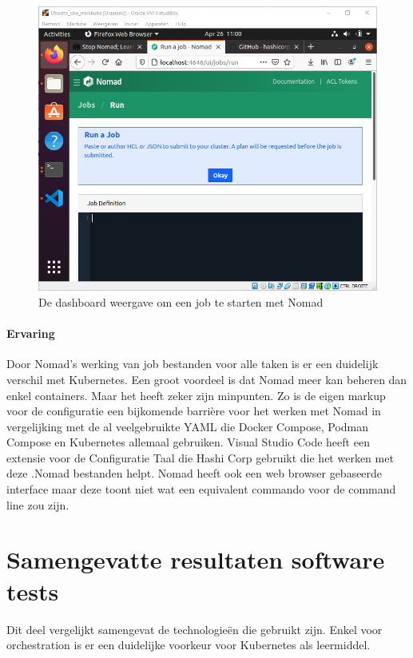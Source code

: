 \begin{figure}[h]
    \includegraphics[width=\linewidth]{img/nomdaddash.png}
    \caption[De Nomad dashboard]{De dashboard weergave om een job te starten met Nomad}
    \label{fig:nomdaddash}
    \centering
\end{figure}


\paragraph{Ervaring}
Door Nomad’s werking van job bestanden voor alle taken is er een duidelijk verschil met Kubernetes. Een groot voordeel is dat Nomad meer kan beheren dan enkel containers. Maar het heeft zeker zijn minpunten. Zo is de eigen markup voor de configuratie een bijkomende barrière voor het werken met Nomad in vergelijking met de al veelgebruikte YAML die Docker Compose, Podman Compose en Kubernetes allemaal gebruiken.  Visual Studio Code heeft een extensie voor de Configuratie Taal die Hashi Corp gebruikt die het werken met deze .Nomad  bestanden helpt. Nomad heeft ook een web browser gebaseerde interface maar deze toont niet wat een equivalent commando voor de command line zou zijn.

\section{Samengevatte resultaten software tests}
Dit deel vergelijkt samengevat de technologieën die gebruikt zijn. Enkel voor orchestration is er een duidelijke voorkeur voor Kubernetes als leermiddel.

